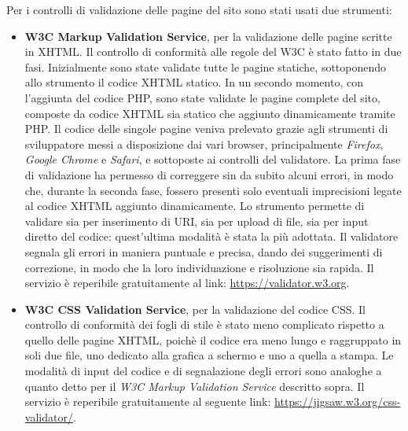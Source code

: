 Per i controlli di validazione delle pagine del sito sono stati usati due strumenti:
\begin{itemize}
	\item \textbf{W3C Markup Validation Service}, per la validazione delle pagine scritte in XHTML. Il controllo di conformità alle regole del W3C è stato fatto in due fasi. Inizialmente sono state validate tutte le pagine statiche, sottoponendo allo strumento il codice XHTML statico. In un secondo momento, con l'aggiunta del codice PHP, sono state validate le pagine complete del sito, composte da codice XHTML sia statico che aggiunto dinamicamente tramite PHP. Il codice delle singole pagine veniva prelevato grazie agli strumenti di sviluppatore messi a disposizione dai vari browser, principalmente \textit{Firefox}, \textit{Google Chrome} e \textit{Safari}, e sottoposte ai controlli del validatore. La prima fase di validazione ha permesso di correggere sin da subito alcuni errori, in modo che, durante la seconda fase, fossero presenti solo eventuali imprecisioni legate al codice XHTML aggiunto dinamicamente. Lo strumento permette di validare sia per inserimento di URI, sia per upload di file, sia per input diretto del codice: quest'ultima modalità è stata la più adottata. Il validatore segnala gli errori in maniera puntuale e precisa, dando dei suggerimenti di correzione, in modo che la loro individuazione e risoluzione sia rapida. Il servizio è reperibile gratuitamente al link: \url{https://validator.w3.org}.
	
	\item \textbf{W3C CSS Validation Service}, per la validazione del codice CSS. Il controllo di conformità dei fogli di stile è stato meno complicato rispetto a quello delle pagine XHTML, poichè il codice era meno lungo e raggruppato in soli due file, uno dedicato alla grafica a schermo e uno a quella a stampa. Le modalità di input del codice e di segnalazione degli errori sono analoghe a quanto detto per il \textit{W3C Markup Validation Service} descritto sopra. Il servizio è reperibile gratuitamente al seguente link: \url{https://jigsaw.w3.org/css-validator/}.
\end{itemize}